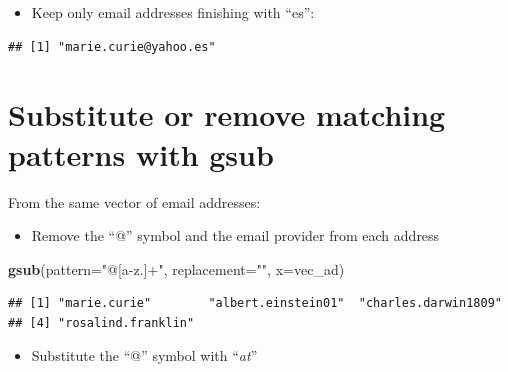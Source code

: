 \documentclass[]{book}
\newenvironment{Shaded}{\begin{snugshade}}{\end{snugshade}}
\newcommand{\DataTypeTok}[1]{\textcolor[rgb]{0.13,0.29,0.53}{#1}}
\newcommand{\KeywordTok}[1]{\textcolor[rgb]{0.13,0.29,0.53}{\textbf{#1}}}
\newcommand{\NormalTok}[1]{#1}
\newcommand{\OtherTok}[1]{\textcolor[rgb]{0.56,0.35,0.01}{#1}}
\newcommand{\StringTok}[1]{\textcolor[rgb]{0.31,0.60,0.02}{#1}}
\providecommand{\tightlist}{%
  \setlength{\itemsep}{0pt}\setlength{\parskip}{0pt}}
\begin{document}
\begin{itemize}
\tightlist
\item
  Keep only email addresses finishing with ``es'':
\end{itemize}

\begin{Shaded}
\end{Shaded}

\begin{verbatim}
## [1] "marie.curie@yahoo.es"
\end{verbatim}

\hypertarget{substitute-or-remove-matching-patterns-with-gsub}{%
\section{Substitute or remove matching patterns with gsub}\label{substitute-or-remove-matching-patterns-with-gsub}}

From the same vector of email addresses:

\begin{itemize}
\tightlist
\item
  Remove the ``@'' symbol and the email provider from each address
\end{itemize}

\begin{Shaded}
\begin{Highlighting}[]
\KeywordTok{gsub}\NormalTok{(}\DataTypeTok{pattern=}\StringTok{"@[a-z.]+"}\NormalTok{,}
        \DataTypeTok{replacement=}\StringTok{""}\NormalTok{,}
        \DataTypeTok{x=}\NormalTok{vec_ad)}
\end{Highlighting}
\end{Shaded}

\begin{verbatim}
## [1] "marie.curie"        "albert.einstein01"  "charles.darwin1809"
## [4] "rosalind.franklin"
\end{verbatim}

\begin{itemize}
\tightlist
\item
  Substitute the ``@'' symbol with ``\emph{at}''
\end{itemize}
\end{document}
